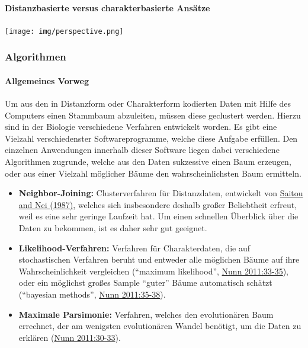 \paragraph{Distanzbasierte versus charakterbasierte Ansätze}

\begin{center}
\texttt{[image: img/perspective.png]}
\end{center}



\subsubsection{\texorpdfstring{{Algorithmen}}{Algorithmen}}

\paragraph{Allgemeines Vorweg}

Um aus den in Distanzform oder Charakterform kodierten Daten mit Hilfe
des Computers einen Stammbaum abzuleiten, müssen diese geclustert
werden. Hierzu sind in der Biologie verschiedene Verfahren entwickelt
worden. Es gibt eine Vielzahl verschiedenster Softwareprogramme, welche
diese Aufgabe erfüllen. Den einzelnen Anwendungen innerhalb dieser
Software liegen dabei verschiedene Algorithmen zugrunde, welche aus den
Daten sukzessive einen Baum erzeugen, oder aus einer Vielzahl möglicher
Bäume den wahrscheinlichsten Baum ermitteln.




\begin{itemize}
\itemsep1pt\parskip0pt
\item
  \textbf{Neighbor-Joining:} Clusterverfahren für Distanzdaten,
  entwickelt von
  \href{http://bibliography.lingpy.org?key=Saitou1987}{Saitou and Nei
  (1987)}, welches sich insbesondere deshalb großer Beliebtheit erfreut,
  weil es eine sehr geringe Laufzeit hat. Um einen schnellen Überblick
  über die Daten zu bekommen, ist es daher sehr gut geeignet.
\item
  \textbf{Likelihood-Verfahren:} Verfahren für Charakterdaten, die auf
  stochastischen Verfahren beruht und entweder alle möglichen Bäume auf
  ihre Wahrscheinlichkeit vergleichen (``maximum likelihood'',
  \href{http://bibliography.lingpy.org?key=Nunn2011}{Nunn 2011:33-35}),
  oder ein möglichst großes Sample ``guter'' Bäume automatisch schätzt
  (``bayesian methods'',
  \href{http://bibliography.lingpy.org?key=Nunn2011}{Nunn 2011:35-38}).
\item
  \textbf{Maximale Parsimonie:} Verfahren, welches den evolutionären
  Baum errechnet, der am wenigsten evolutionären Wandel benötigt, um die
  Daten zu erklären
  (\href{http://bibliography.lingpy.org?key=Nunn2011}{Nunn 2011:30-33}).
\end{itemize}




